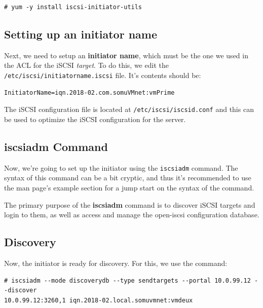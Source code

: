 \vspace{-15pt}
\begin{verbatim}
# yum -y install iscsi-initiator-utils
\end{verbatim}
\vspace{-10pt}	

\subsection{Setting up an initiator name}
Next, we need to setup an \textbf{initiator name}, which must be the one we used in the ACL for the iSCSI \textit{target}. To do this, we edit the \verb|/etc/iscsi/initiatorname.iscsi| file. It's contents should be:

\vspace{-15pt}
\begin{verbatim}
InitiatorName=iqn.2018-02.com.somuVMnet:vmPrime
\end{verbatim}
\vspace{-10pt}	

\noindent
The iSCSI configuration file is located at \verb|/etc/iscsi/iscsid.conf| and this can be used to optimize the iSCSI configuration for the server. 

\subsection{iscsiadm Command}
Now, we're going to set up the initiator using the \verb|iscsiadm| command. The syntax of this command can be a bit cryptic, and thus it's recommended to use the man page's example section for a jump start on the syntax of the command. 

The primary purpose of the \textbf{iscsiadm} command is to discover iSCSI targets and login to them, as well as access and manage the open-iscsi configuration database. 

\subsection{Discovery}
Now, the initiator is ready for discovery. For this, we use the command:

\vspace{-15pt}
\begin{verbatim}
# iscsiadm --mode discoverydb --type sendtargets --portal 10.0.99.12 --discover
10.0.99.12:3260,1 iqn.2018-02.local.somuvmnet:vmdeux
\end{verbatim}
\vspace{-10pt}	

